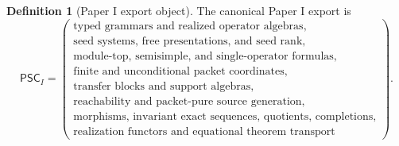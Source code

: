 \documentclass[11pt]{article}
\theoremstyle{definition}
\newtheorem{definition}[definition]{Definition}
\theoremstyle{remark}
\theoremstyle{definition}\newtheorem{example}[theorem]{Example}
\newcommand{\RecordID}[1]{\label{record:#1}}
\begin{document}
\begin{definition}[Paper I export object]
\label{def:paper-one-export}
The canonical Paper I export is
\[
\boxed{
\mathsf{PSC}_I=
\left(
\begin{array}{c}
\text{typed grammars and realized operator algebras},\\
\text{seed systems, free presentations, and seed rank},\\
\text{module-top, semisimple, and single-operator formulas},\\
\text{finite and unconditional packet coordinates},\\
\text{transfer blocks and support algebras},\\
\text{reachability and packet-pure source generation},\\
\text{morphisms, invariant exact sequences, quotients, completions},\\
\text{realization functors and equational theorem transport}
\end{array}
\right).
}
\]
\end{definition}
\RecordID{PSC-I-EXPORT}
\end{document}
